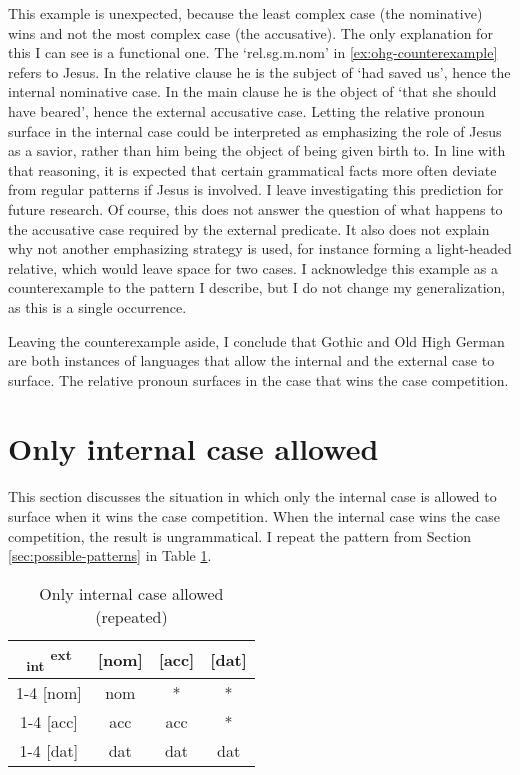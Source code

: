 This example is unexpected, because the least complex case (the nominative) wins and not the most complex case (the accusative).
The only explanation for this I can see is a functional one. The  `\ac{rel}.\ac{sg}.\ac{m}.\ac{nom}' in \ref{ex:ohg-counterexample} refers to Jesus. In the relative clause he is the subject of  `had saved us', hence the internal nominative case. In the main clause he is the object of  `that she should have beared', hence the external accusative case.
Letting the relative pronoun surface in the internal case could be interpreted as emphasizing the role of Jesus as a savior, rather than him being the object of being given birth to. In line with that reasoning, it is expected that certain grammatical facts more often deviate from regular patterns if Jesus is involved. I leave investigating this prediction for future research.
Of course, this does not answer the question of what happens to the accusative case required by the external predicate. It also does not explain why not another emphasizing strategy is used, for instance forming a light-headed relative, which would leave space for two cases.
I acknowledge this example as a counterexample to the pattern I describe, but I do not change my generalization, as this is a single occurrence.

Leaving the counterexample aside, I conclude that Gothic and Old High German are both instances of languages that allow the internal and the external case to surface. The relative pronoun surfaces in the case that wins the case competition.


\section{Only internal case allowed}\label{sec:pattern-ii}

This section discusses the situation in which only the internal case is allowed to surface when it wins the case competition. When the internal case wins the case competition, the result is ungrammatical. I repeat the pattern from Section \ref{sec:possible-patterns} in Table \ref{tbl:case-competition-only-int-repeated}.

\begin{table}[H]
  \center
  \caption{Only internal case allowed (repeated)}
  \begin{tabular}{c|c|c|c}
    \toprule
    \textsubscript{\ac{int}} \textsuperscript{\ac{ext}}
           & [\ac{nom}]
           & [\ac{acc}]
           & [\ac{dat}]
           \\ \cmidrule{1-4}
       [\ac{nom}]
           & \ac{nom}
           & *
           & *
           \\ \cmidrule{1-4}
       [\ac{acc}]
           & \ac{acc}
           & \ac{acc}
           & *
           \\ \cmidrule{1-4}
       [\ac{dat}]
           & \ac{dat}
           & \ac{dat}
           & \ac{dat}
           \\
     \bottomrule
  \end{tabular}
    \label{tbl:case-competition-only-int-repeated}
\end{table}

